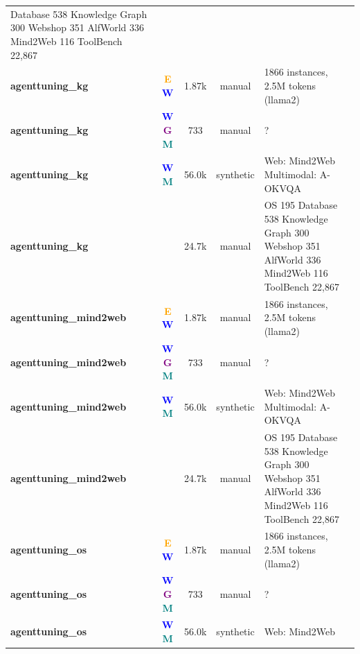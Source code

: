 \begin{table}[t]
\begin{tabular*}{\textwidth}{@{\extracolsep{\fill}}l c c c p{5cm}}
Database 538
Knowledge Graph 300
Webshop 351
AlfWorld 336
Mind2Web 116
ToolBench 22,867 \\
        \textbf{agenttuning\_kg \cite{agenttuning_enabling_2310_12823}} & \textcolor{orange}{\textbf{E}} \textcolor{blue}{\textbf{W}} & 1.87k & manual & 1866 instances, 2.5M tokens (llama2) \\
        \textbf{agenttuning\_kg \cite{webvoyager_building__2401_13919}} & \textcolor{blue}{\textbf{W}} \textcolor{purple}{\textbf{G}} \textcolor{teal}{\textbf{M}} & 733 & manual & ? \\
        \textbf{agenttuning\_kg \cite{agent_lumos_unified__2311_05657}} & \textcolor{blue}{\textbf{W}} \textcolor{teal}{\textbf{M}} & 56.0k & synthetic & Web: Mind2Web
Multimodal: A-OKVQA \\
        \textbf{agenttuning\_kg \cite{agent_flan_designing_2403_12881}} &  & 24.7k & manual & OS 195
Database 538
Knowledge Graph 300
Webshop 351
AlfWorld 336
Mind2Web 116
ToolBench 22,867 \\
        \textbf{agenttuning\_mind2web \cite{agenttuning_enabling_2310_12823}} & \textcolor{orange}{\textbf{E}} \textcolor{blue}{\textbf{W}} & 1.87k & manual & 1866 instances, 2.5M tokens (llama2) \\
        \textbf{agenttuning\_mind2web \cite{webvoyager_building__2401_13919}} & \textcolor{blue}{\textbf{W}} \textcolor{purple}{\textbf{G}} \textcolor{teal}{\textbf{M}} & 733 & manual & ? \\
        \textbf{agenttuning\_mind2web \cite{agent_lumos_unified__2311_05657}} & \textcolor{blue}{\textbf{W}} \textcolor{teal}{\textbf{M}} & 56.0k & synthetic & Web: Mind2Web
Multimodal: A-OKVQA \\
        \textbf{agenttuning\_mind2web \cite{agent_flan_designing_2403_12881}} &  & 24.7k & manual & OS 195
Database 538
Knowledge Graph 300
Webshop 351
AlfWorld 336
Mind2Web 116
ToolBench 22,867 \\
        \textbf{agenttuning\_os \cite{agenttuning_enabling_2310_12823}} & \textcolor{orange}{\textbf{E}} \textcolor{blue}{\textbf{W}} & 1.87k & manual & 1866 instances, 2.5M tokens (llama2) \\
        \textbf{agenttuning\_os \cite{webvoyager_building__2401_13919}} & \textcolor{blue}{\textbf{W}} \textcolor{purple}{\textbf{G}} \textcolor{teal}{\textbf{M}} & 733 & manual & ? \\
        \textbf{agenttuning\_os \cite{agent_lumos_unified__2311_05657}} & \textcolor{blue}{\textbf{W}} \textcolor{teal}{\textbf{M}} & 56.0k & synthetic & Web: Mind2Web

\end{tabular*}
\end{table}
